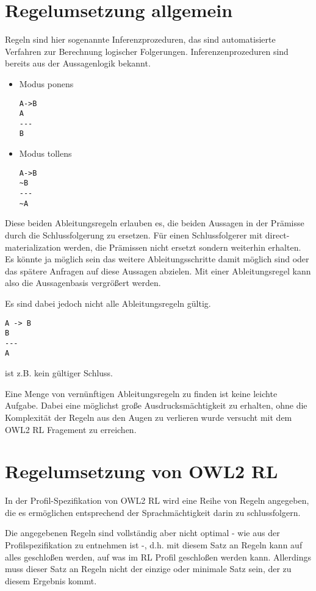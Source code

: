 \section{Regelumsetzung allgemein}
Regeln sind hier sogenannte Inferenzprozeduren, das sind automatisierte Verfahren zur Berechnung logischer Folgerungen. Inferenzenprozeduren sind bereits aus der Aussagenlogik bekannt.

\begin{itemize}
  \item Modus ponens
	\begin{verbatim}
A->B
A
---
B
	\end{verbatim}

  \item Modus tollens
\begin{verbatim}
A->B
~B
---
~A
\end{verbatim}
\end{itemize}

Diese beiden Ableitungsregeln erlauben es, die beiden Aussagen in der Prämisse durch die Schlussfolgerung zu ersetzen. Für einen Schlussfolgerer mit direct-materialization werden, die Prämissen nicht ersetzt sondern weiterhin erhalten. Es könnte ja möglich sein das weitere Ableitungsschritte damit möglich sind oder das spätere Anfragen auf diese Aussagen abzielen. Mit einer Ableitungsregel kann also die Aussagenbasis vergrößert werden.

Es sind dabei jedoch nicht alle Ableitungsregeln gültig.
\begin{verbatim}
A -> B
B
---
A
\end{verbatim}

ist z.B. kein gültiger Schluss.

Eine Menge von vernünftigen Ableitungsregeln zu finden ist keine leichte Aufgabe. Dabei eine möglichst große Ausdrucksmächtigkeit zu erhalten, ohne die Komplexität der Regeln aus den Augen zu verlieren wurde versucht mit dem OWL2 RL Fragement zu erreichen.


\section{Regelumsetzung von OWL2 RL}

In der Profil-Spezifikation von OWL2 RL \cite{OWL2Profiles} wird eine Reihe von Regeln angegeben, die es ermöglichen entsprechend der Sprachmächtigkeit darin zu schlussfolgern.

Die angegebenen Regeln sind vollständig aber nicht optimal - wie aus der Profilspezifikation zu entnehmen ist -, d.h. mit diesem Satz an Regeln kann auf alles geschloßen werden, auf was im RL Profil geschloßen werden kann. Allerdings muss dieser Satz an Regeln nicht der einzige oder minimale Satz sein, der zu diesem Ergebnis kommt.

